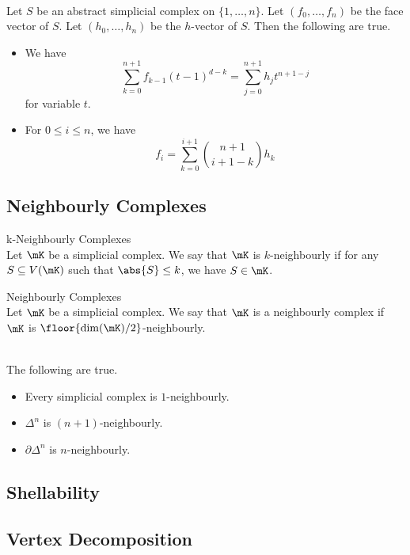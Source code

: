 \documentclass[a4paper]{article}
\begin{document}
\begin{lmm}{}{}\\
Let $S$ be an abstract simplicial complex on $\{1,\dots,n\}$. Let $(f_0,\dots,f_n)$ be the face vector of $S$. Let $(h_0,\dots,h_n)$ be the $h$-vector of $S$. Then the following are true. 
\begin{itemize}
\item We have $$\sum_{k=0}^{n+1}f_{k-1}(t-1)^{d-k}=\sum_{j=0}^{n+1}h_jt^{n+1-j}$$ for variable $t$. 
\item For $0\leq i\leq n$, we have $$f_i=\sum_{k=0}^{i+1}\binom{n+1}{i+1-k}h_k$$
\end{itemize}
\end{lmm}

\subsection{Neighbourly Complexes}
\begin{defn}{k-Neighbourly Complexes}{}\\
Let $\mK$ be a simplicial complex. We say that $\mK$ is $k$-neighbourly if for any $S\subseteq V(\mK)$ such that $\abs{S}\leq k$, we have $S\in\mK$. 
\end{defn}

\begin{defn}{Neighbourly Complexes}{}\\
Let $\mK$ be a simplicial complex. We say that $\mK$ is a neighbourly complex if $\mK$ is $\floor{\dim(\mK)/2}$-neighbourly. 
\end{defn}

\begin{eg}{}{}\\
The following are true. 
\begin{itemize}
\item Every simplicial complex is $1$-neighbourly. 
\item $\Delta^n$ is $(n+1)$-neighbourly. 
\item $\partial\Delta^n$ is $n$-neighbourly. 
\end{itemize}
\end{eg}

\subsection{Shellability}

\subsection{Vertex Decomposition}
\end{document}

